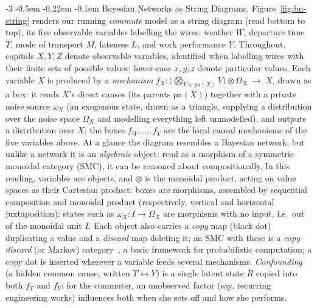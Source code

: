 \documentclass[runningheads]{llncs}
\makeatletter
\renewcommand\paragraph{\@startsection{paragraph}{4}{\z@}%
                       {-3\p@ \@plus -2\p@ \@minus -2\p@}%
                       {-0.5em \@plus -0.22em \@minus -0.1em}%
                       {\normalfont\normalsize\bfseries}}
\makeatother
\begin{document}
\paragraph{Bayesian Networks as String Diagrams.}
Figure~\ref{fig:bn-string} renders our running \emph{commute} model as a string diagram (read bottom to top), its five observable variables labelling the wires: weather $W$, departure time $T$, mode of transport $M$, lateness $L$, and work performance $Y$. Throughout, capitals $X,Y,Z$ denote observable variables, identified when labelling wires with their finite sets of possible values; lower-case $x,y,z$ denote particular values. Each variable $X$ is produced by a \emph{mechanism} $f_X \colon \big(\textstyle\bigotimes_{V \in \mathrm{pa}(X)} V\big)\otimes \Omega_X \;\longrightarrow\; X$, drawn as a box: it reads $X$'s direct causes (its parents $\mathrm{pa}(X)$) together with a private noise source $\omega_X$ (an exogenous state, drawn as a triangle, supplying a distribution over the noise space $\Omega_X$ and modelling everything left unmodelled), and outputs a distribution over $X$; the boxes $f_W,\dots,f_Y$ are the local causal mechanisms of the five variables above. At a glance the diagram resembles a Bayesian network, but unlike a network it is an \emph{algebraic} object: read as a morphism of a symmetric monoidal category (SMC), it can be reasoned about compositionally. In this reading, variables are objects, and $\otimes$ is the monoidal product, acting on value spaces as their Cartesian product; boxes are morphisms, assembled by sequential composition and monoidal product (respectively, vertical and horizontal juxtaposition); states such as $\omega_X : I \to \Omega_X$ are morphisms with no input, i.e.\ out of the monoidal unit $I$. Each object also carries a \emph{copy} map (black dot) duplicating a value and a \emph{discard} map deleting it; an SMC with these is a \emph{copy--discard} (or Markov) category~\cite{fritz2020synthetic,jacobs2015}, a basic framework for probabilistic computation; a copy dot is inserted wherever a variable feeds several mechanisms. \emph{Confounding} (a hidden common cause, written $T\leftrightarrow Y$) is a single latent state $R$ copied into both $f_T$ and $f_Y$: for the commuter, an unobserved factor (say, recurring engineering works) influences both when she sets off and how she performs.


\end{document}
